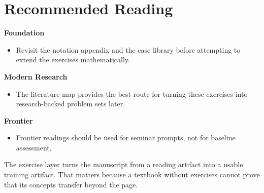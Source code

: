 \section{Recommended Reading}

\begin{readingbox}
\textbf{Foundation}
\begin{itemize}[nosep]
  \item Revisit the notation appendix and the case library before attempting to
        extend the exercises mathematically.
\end{itemize}
\textbf{Modern Research}
\begin{itemize}[nosep]
  \item The literature map provides the best route for turning these exercises
        into research-backed problem sets later.
\end{itemize}
\textbf{Frontier}
\begin{itemize}[nosep]
  \item Frontier readings should be used for seminar prompts, not for baseline
        assessment.
\end{itemize}
\end{readingbox}

\begin{summarybox}
The exercise layer turns the manuscript from a reading artifact into a usable
training artifact. That matters because a textbook without exercises cannot
prove that its concepts transfer beyond the page.
\end{summarybox}
